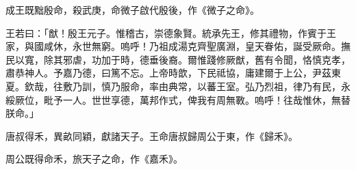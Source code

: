 
\begin{pinyinscope}
成王既黜殷命，殺武庚，命微子啟代殷後，作《微子之命》。

王若曰：「猷！殷王元子。惟稽古，崇德象賢。統承先王，修其禮物，作賓于王家，與國咸休，永世無窮。嗚呼！乃祖成湯克齊聖廣淵，皇天眷佑，誕受厥命。撫民以寬，除其邪虐，功加于時，德垂後裔。爾惟踐修厥猷，舊有令聞，恪慎克孝，肅恭神人。予嘉乃德，曰篤不忘。上帝時歆，下民祗協，庸建爾于上公，尹茲東夏。欽哉，往敷乃訓，慎乃服命，率由典常，以蕃王室。弘乃烈祖，律乃有民，永綏厥位，毗予一人。世世享德，萬邦作式，俾我有周無斁。嗚呼！往哉惟休，無替朕命。」

唐叔得禾，異畝同穎，獻諸天子。王命唐叔歸周公于東，作《歸禾》。

周公既得命禾，旅天子之命，作《嘉禾》。


\end{pinyinscope}